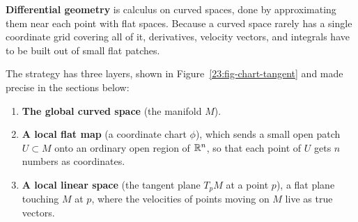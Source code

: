 \textbf{Differential geometry} is calculus on curved spaces, done by approximating them near each point with flat spaces. Because a curved space rarely has a single coordinate grid covering all of it, derivatives, velocity vectors, and integrals have to be built out of small flat patches.

The strategy has three layers, shown in Figure~\ref{23:fig-chart-tangent} and made precise in the sections below:
\begin{enumerate}
\item \textbf{The global curved space} (the manifold $M$).
\item \textbf{A local flat map} (a coordinate chart $\phi$), which sends a small open patch $U \subset M$ onto an ordinary open region of $\mathbb{R}^n$, so that each point of $U$ gets $n$ numbers as coordinates.
\item \textbf{A local linear space} (the tangent plane $T_p M$ at a point $p$), a flat plane touching $M$ at $p$, where the velocities of points moving on $M$ live as true vectors.
\end{enumerate}

